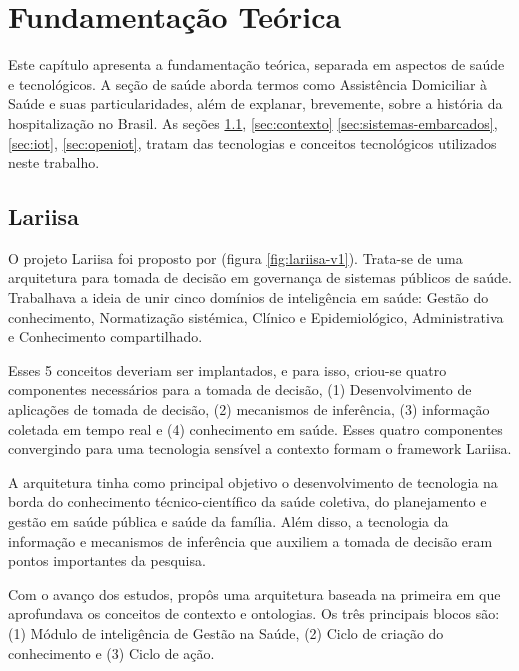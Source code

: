 \chapter{Fundamentação Teórica}\label{cap:fundamentacao-teorica}

Este capítulo apresenta a fundamentação teórica, separada em aspectos de saúde e
tecnológicos. A seção de saúde aborda termos como Assistência Domiciliar à
Saúde e suas particularidades, além de explanar, brevemente, sobre a história
da hospitalização no Brasil. As seções \ref{sec:lariisa}, \ref{sec:contexto}
\ref{sec:sistemas-embarcados}, \ref{sec:iot}, \ref{sec:openiot}, tratam das
tecnologias e conceitos tecnológicos utilizados neste trabalho.

\section{Lariisa}\label{sec:lariisa}

O projeto Lariisa foi proposto por 
(figura \ref{fig:lariisa-v1}). Trata-se de uma arquitetura para tomada de
decisão em governança de sistemas públicos de saúde. Trabalhava a ideia de unir
cinco domínios de inteligência em saúde: Gestão do conhecimento, Normatização
sistémica,  Clínico e Epidemiológico, Administrativa e Conhecimento
compartilhado.

Esses 5 conceitos deveriam ser implantados, e para isso, criou-se quatro
componentes necessários para a tomada de decisão, (1) Desenvolvimento de
aplicações de tomada de decisão, (2) mecanismos de inferência, (3) informação
coletada em tempo real e (4) conhecimento em saúde. Esses quatro componentes
convergindo para uma tecnologia sensível a contexto formam o framework Lariisa.


A arquitetura tinha como principal objetivo o desenvolvimento de tecnologia na
borda do conhecimento técnico-científico da saúde coletiva, do planejamento e
gestão em saúde pública e saúde da família. Além disso, a tecnologia da
informação e mecanismos de inferência que auxiliem a tomada de decisão eram
pontos importantes da pesquisa.

Com o avanço dos estudos,  propôs uma
arquitetura baseada na primeira em que aprofundava os conceitos de contexto e
ontologias. Os três principais blocos são: (1) Módulo de inteligência de Gestão
na Saúde, (2) Ciclo de criação do conhecimento e (3) Ciclo de ação.

